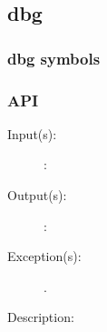 %
%
%
%
%              

\label{dbg}
\subsection{dbg}

\subsubsection{dbg symbols}

\subsubsection{API}
\begin{description}
\label{dbg_}
\item[{\cfunc[]{dbg\_}{}}: ]
	\begin{description}\item[]
	\item[Input(s): ]
		\begin{description}\item[]
		\item[: ]
		\end{description}
	\item[Output(s): ]
		\begin{description}\item[]
		\item[: ]
		\end{description}
	\item[Exception(s): ]
		\begin{description}\item[]
		\item[.]
		\end{description}
	\item[Description: ]
	\end{description}
\end{description}
